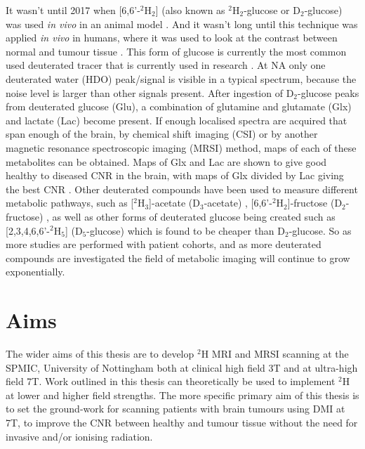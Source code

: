 It wasn't until 2017 when [6,6'-$^2$H$_2$] (also known as $^2$H$_2$-glucose or D$_2$-glucose) was used \textit{in vivo} in an animal model \cite{Lu2017QuantitativeSpectroscopy}. And it wasn't long until this technique was applied \textit{in vivo} in humans, where it was used to look at the contrast between normal and tumour tissue \cite{DeFeyter2018DeuteriumVivo}. This form of glucose is currently the most common used deuterated tracer that is currently used in research \cite{DeFeyter2018DeuteriumVivo,DeFeyter2021DeuteriumFuture,Ruhm2022Dynamic9.4T,Roig2022Deuterium7T,deGraaf2020OnImaging}. At \ac{NA} only one deuterated water (HDO) peak/signal is visible in a typical spectrum, because the noise level is larger than other signals present. After ingestion of D$_2$-glucose peaks from deuterated glucose (Glu), a combination of glutamine and glutamate (Glx) and lactate (Lac) become present. If enough localised spectra are acquired that span enough of the brain, by chemical shift imaging (CSI) or by another magnetic resonance spectroscopic imaging (MRSI) method, maps of each of these metabolites can be obtained. Maps of Glx and Lac are shown to give good healthy to diseased \ac{CNR} in the brain, with maps of Glx divided by Lac giving the best \ac{CNR} \cite{DeFeyter2018DeuteriumVivo,Straathof2021DeuteriumBrain}. Other deuterated compounds have been used to measure different metabolic pathways, such as [$^2$H$_3$]-acetate (D$_3$-acetate) \cite{DeFeyter2018DeuteriumVivo,Rich20201HVivo}, [6,6'-$^2$H$_2$]-fructose (D$_2$-fructose) \cite{Zhang202366-2H2Cancer}, as well as other forms of deuterated glucose being created such as [2,3,4,6,6'-$^2$H$_5$] (D$_5$-glucose) \cite{Zou2023AImaging} which is found to be cheaper than D$_2$-glucose. So as more studies are performed with patient cohorts, and as more deuterated compounds are investigated the field of metabolic imaging will continue to grow exponentially. 


\section{Aims}

The wider aims of this thesis are to develop $^2$H \ac{MRI} and \ac{MRSI} scanning at the \ac{SPMIC}, University of Nottingham both at clinical high field 3T and at ultra-high field 7T. Work outlined in this thesis can theoretically be used to implement $^2$H at lower and higher field strengths. The more specific primary aim of this thesis is to set the ground-work for scanning patients with brain tumours using DMI at 7T, to improve the \ac{CNR} between healthy and tumour tissue without the need for invasive and/or ionising radiation.

